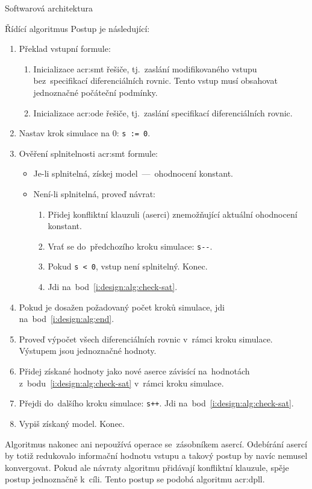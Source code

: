 \documentclass[thesis=M,czech]{FITthesis}[2012/06/26]
\newcommand{\acrlabel}[1]{acr:#1}
\newcommand{\acr}[1]{\acrshort{\acrlabel{#1}}}
\newcommand{\id}[1]{\texttt{#1}}
\newcommand{\rf}[1]{\ref{#1}}
\begin{document}
\begin{section}{Softwarová architektura}
\begin{subsection}{Řídící algoritmus}
Postup je následující:
\begin{enumerate}
\item Překlad vstupní formule:
   \begin{enumerate}
   \item Inicializace \acr{smt} řešiče,
      tj.~zaslání modifikovaného vstupu
      bez~specifikací diferenciálních rovnic.
      Tento vstup musí obsahovat jednoznačné počáteční podmínky.
   \item Inicializace \acr{ode} řešiče,
      tj.~zaslání specifikací diferenciálních rovnic.
   \end{enumerate}
\item Nastav krok simulace na 0: \id{s~:= 0}.
\item \label{i:design:alg:check-sat}
   Ověření splnitelnosti \acr{smt} formule:
   \begin{itemize}
   \item Je-li splnitelná, získej model~---~ohodnocení konstant.
   \item Není-li splnitelná, proveď návrat:
      \begin{enumerate}
      \item Přidej konfliktní klauzuli (aserci)
         znemožňující aktuální ohodnocení konstant.
      \item Vrať se do~předchozího kroku simulace:
         \id{s-{}-}.
      \item Pokud \id{s~< 0}, vstup není splnitelný. Konec.
      \item Jdi na~bod~\rf{i:design:alg:check-sat}.
      \end{enumerate}
   \end{itemize}
\item Pokud je dosažen požadovaný počet kroků simulace,
   jdi na~bod~\rf{i:design:alg:end}.
\item Proveď výpočet všech diferenciálních rovnic
   v~rámci kroku simulace.
   Výstupem jsou jednoznačné hodnoty.
\item Přidej získané hodnoty jako nové aserce
   závisící na~hodnotách z~bodu~\rf{i:design:alg:check-sat}
   v~rámci kroku simulace.
\item Přejdi do~dalšího kroku simulace: \id{s+{}+}.
   Jdi na~bod~\rf{i:design:alg:check-sat}.
\item \label{i:design:alg:end}
   Vypiš získaný model. Konec.
\end{enumerate}

Algoritmus nakonec ani nepoužívá operace
se~zásobníkem asercí.
Odebírání asercí by totiž redukovalo
informační hodnotu vstupu
a takový postup by navíc nemusel konvergovat.
Pokud ale návraty algoritmu přidávají konfliktní klauzule,
spěje postup jednoznačně k~cíli.
Tento postup se podobá algoritmu \acr{dpll}.


\end{subsection}
\end{section}
\end{document}
